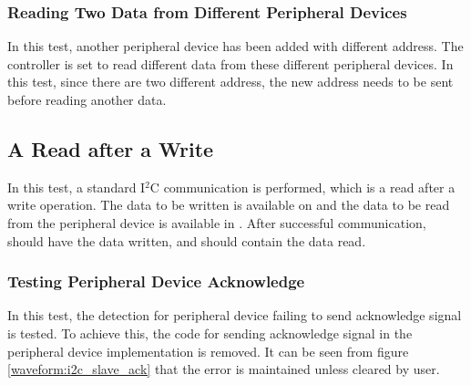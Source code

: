 \subsubsection{Reading Two Data from Different Peripheral Devices}
In this test, another peripheral device has been added with different address. The controller is set to read different data from these different peripheral devices. In this test, since there are two different address, the new address needs to be sent before reading another data.

\subsection{A Read after a Write}
In this test, a standard I$^2$C communication is performed, which is a read after a write operation. The data to be written is available on  and the data to be read from the peripheral device is available in . After successful communication,  should have the data written, and  should contain the data read.

\newpage
\subsubsection{Testing Peripheral Device Acknowledge}
In this test, the detection for peripheral device failing to send acknowledge signal is tested. To achieve this, the code for sending acknowledge signal in the peripheral device implementation is removed. It can be seen from figure \ref{waveform:i2c_slave_ack} that the error is maintained unless cleared by user.
